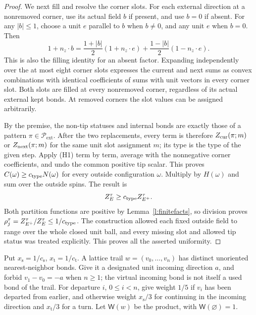 \begin{proof}
We next fill and resolve the corner slots. For each external
direction at a nonremoved corner, use its actual field
\(b\) if present, and use \(b=0\) if absent.
For any \(|b|\le1\), choose a unit \(e\) parallel to \(b\)
when \(b\ne0\), and any unit \(e\) when \(b=0\). Then
\[
 1+n_z\cdot b
 =\frac{1+|b|}{2}(1+n_z\cdot e)
       +\frac{1-|b|}{2}(1-n_z\cdot e).
\]
This is also the filling identity for an absent factor.
Expanding independently over the at most eight corner slots
expresses the current and next sums as convex combinations
with identical coefficients of sums with unit vectors in every
corner slot. Both slots are filled at every nonremoved corner,
regardless of its actual external kept bonds.
At removed corners the slot values can be assigned arbitrarily.

By the premise, the non-tip statuses and internal bonds are
exactly those of a pattern \(\pi\in\mathcal P_{\mathrm{ext}}\).
After the two replacements, every term is therefore
\(Z_{\rm cur}(\pi;m)\) or \(Z_{\rm next}(\pi;m)\) for the same
unit slot assignment \(m\); its type is the type of the given
step. Apply (H1) term by term, average with the nonnegative
corner coefficients, and undo the common positive tip scalar.
This proves
\(C(\omega)\ge c_{\rm type}N(\omega)\)
for every outside configuration \(\omega\).
Multiply by \(H(\omega)\) and sum over the outside spins.
The result is
\[
 Z_E^\tau\ge c_{\rm type}Z_{E^+}^\tau.
\]
Both partition functions are positive by
Lemma~\ref{l:finitefacts}, so division proves
\(\rho_j^\tau=Z_{E^+}^\tau/Z_E^\tau\le1/c_{\rm type}\).
The construction allowed each fixed outside field to range
over the whole closed unit ball, and every missing slot and
allowed tip status was treated explicitly. This proves all
the asserted uniformity.
\end{proof}

\begin{definition}\label{d:weights}
Put \(x_{\mathrm s}=1/c_{\mathrm s}\), \(x_{\mathrm t}=1/c_{\mathrm t}\).
A lattice trail \(w=(v_0,\ldots,v_n)\) has distinct unoriented
nearest-neighbor bonds. Give it a designated unit incoming direction
\(a\), and forbid \(v_1-v_0=-a\) when \(n\ge1\); the virtual
incoming bond is not itself a used bond of the trail.
For departure \(i\), \(0\le i<n\), give weight \(1/5\) if \(v_i\)
has been departed from earlier, and otherwise weight \(x_{\mathrm s}/3\)
for continuing in the incoming direction and \(x_{\mathrm t}/3\)
for a turn. Let \(\mathsf W(w)\) be the product, with
\(\mathsf W(\varnothing)=1\).
\end{definition}

